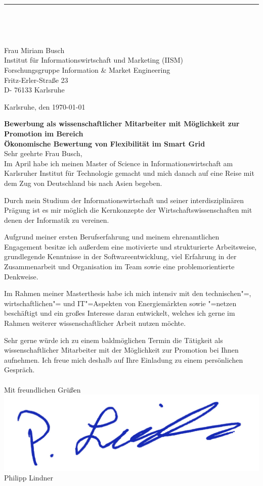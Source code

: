 \documentclass[sans,11pt,a4paper]{moderncv}
\makeatletter
\renewcommand*{\makecvtitle}{%
  \recomputecvlengths%
  \makecvfooter%
  \newbox{\makecvtitlepicturebox}%
  \savebox{\makecvtitlepicturebox}{%
    \ifthenelse{\isundefined{\@photo}}%
      {
        \@initializelength{\makecvtitlepicturewidth}%
        \settowidth{\makecvtitlepicturewidth}{0pt}%
      }%
      {%
       \setlength\fboxrule{\@photoframewidth}%
       \ifdim\@photoframewidth=0pt%
         \setlength{\fboxsep}{0pt}\fi%
       {\color{color1}\framebox{\texttt{[image: \\@photo]}}}}
        \@initializelength{\makecvtitlepicturewidth}%
        \settowidth{\makecvtitlepicturewidth}{\usebox{\makecvtitlepicturebox}}%
      }%

 {   \raggedright\namefont{\color{color2}\MakeLowercase{\@firstname}}\color{color1}\MakeLowercase{\@familyname}}%
    \hfill\usebox{\makecvtitlepicturebox}%
\\[-.35em]%
  {\color{color2}\rule{\textwidth}{.25ex}}%
  \ifthenelse{\equal{\@title}{}}{}{\\[1.25em]\null\hfill\titlestyle{\@title}}\\[0.0em]%
  \ifthenelse{\isundefined{\@quote}}%
    {}%
    {{\null\hfill\begin{minipage}{\quotewidth}\centering\quotestyle{\@quote}\end{minipage}\hfill\null\\[2.5em]}}%
  \par}%
\makeatother
\begin{document}
\vspace*{2.10cm}
\makecvtitle
\linespread {0.9}
Frau Miriam Busch\\
Institut für Informationswirtschaft und Marketing (IISM)\\
Forschungsgruppe Information \& Market Engineering \\
Fritz-Erler-Straße 23\\
D- 76133 Karlsruhe \\

\linespread {1.175}
\vspace*{1.5cm}

\begin{flushright}
	Karlsruhe, den \today
\end{flushright}

\textbf{Bewerbung als wissenschaftlicher Mitarbeiter mit Möglichkeit zur Promotion im Bereich\\ \glqq Ökonomische
	Bewertung von Flexibilität im Smart Grid\grqq} \\

Sehr geehrte Frau Busch,\\


Im April habe ich meinen Master of Science in Informationswirtschaft am Karlsruher Institut für Technologie gemacht und mich danach auf eine Reise mit dem Zug von Deutschland bis nach Asien begeben. 

Durch mein Studium der Informationswirtschaft und seiner interdisziplinären Prägung ist es mir möglich die Kernkonzepte der Wirtschaftswissenschaften mit denen der Informatik zu vereinen. 


Aufgrund meiner ersten Berufserfahrung und meinem ehrenamtlichen Engagement besitze ich außerdem eine motivierte und strukturierte Arbeitsweise, grundlegende Kenntnisse in der Softwareentwicklung, viel Erfahrung in der Zusammenarbeit und Organisation im Team sowie eine problemorientierte Denkweise. 

Im Rahmen meiner Masterthesis habe ich mich intensiv mit den technischen"=, wirtschaftlichen"= und IT"=Aspekten von Energiemärkten sowie "=netzen beschäftigt und ein großes Interesse daran entwickelt, welches ich gerne im Rahmen weiterer wissenschaftlicher Arbeit nutzen möchte. 

Sehr gerne würde ich zu einem baldmöglichen Termin die Tätigkeit als wissenschaftlicher Mitarbeiter mit der Möglichkeit zur Promotion bei Ihnen aufnehmen. Ich freue mich deshalb auf Ihre Einladung zu einem persönlichen Gespräch.\\\\

Mit freundlichen Grüßen\\
\includegraphics[scale=0.75]{Unterschrift}
\\Philipp Lindner

\closesection{}                   %

 
\end{document}
